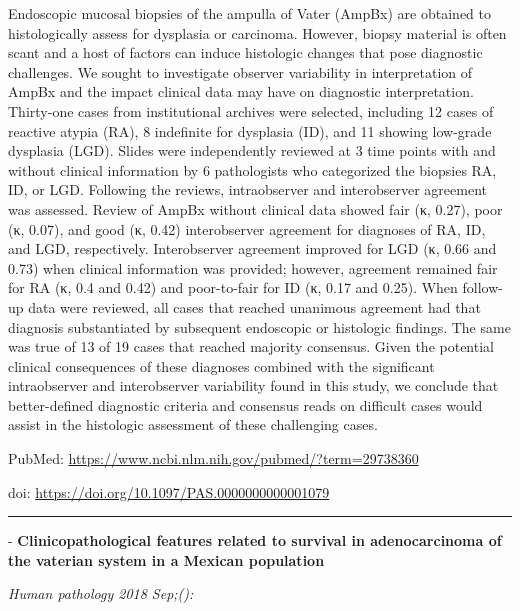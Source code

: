 \documentclass[]{article}
\begin{document}
Endoscopic mucosal biopsies of the ampulla of Vater (AmpBx) are obtained
to histologically assess for dysplasia or carcinoma. However, biopsy
material is often scant and a host of factors can induce histologic
changes that pose diagnostic challenges. We sought to investigate
observer variability in interpretation of AmpBx and the impact clinical
data may have on diagnostic interpretation. Thirty-one cases from
institutional archives were selected, including 12 cases of reactive
atypia (RA), 8 indefinite for dysplasia (ID), and 11 showing low-grade
dysplasia (LGD). Slides were independently reviewed at 3 time points
with and without clinical information by 6 pathologists who categorized
the biopsies RA, ID, or LGD. Following the reviews, intraobserver and
interobserver agreement was assessed. Review of AmpBx without clinical
data showed fair (κ, 0.27), poor (κ, 0.07), and good (κ, 0.42)
interobserver agreement for diagnoses of RA, ID, and LGD, respectively.
Interobserver agreement improved for LGD (κ, 0.66 and 0.73) when
clinical information was provided; however, agreement remained fair for
RA (κ, 0.4 and 0.42) and poor-to-fair for ID (κ, 0.17 and 0.25). When
follow-up data were reviewed, all cases that reached unanimous agreement
had that diagnosis substantiated by subsequent endoscopic or histologic
findings. The same was true of 13 of 19 cases that reached majority
consensus. Given the potential clinical consequences of these diagnoses
combined with the significant intraobserver and interobserver
variability found in this study, we conclude that better-defined
diagnostic criteria and consensus reads on difficult cases would assist
in the histologic assessment of these challenging cases.

PubMed: \url{https://www.ncbi.nlm.nih.gov/pubmed/?term=29738360}

doi: \url{https://doi.org/10.1097/PAS.0000000000001079}

{}

{}

\begin{center}\rule{0.5\linewidth}{\linethickness}\end{center}

 - \textbf{Clinicopathological features related to survival in
adenocarcinoma of the vaterian system in a Mexican population}

\emph{Human pathology 2018 Sep;():}
\end{document}
